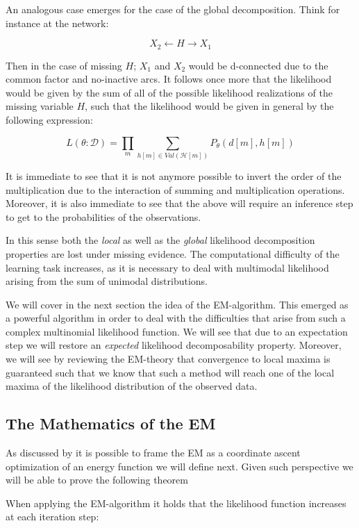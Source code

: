 \documentclass[11pt]{article}
\begin{document}
\begin{article}
An analogous case emerges for the case of the global
decomposition. Think for instance at the network:

$$ X_2 \leftarrow  H \rightarrow X_1 $$

Then in the case of missing \(H\); \(X_1\) and \(X_2\) would be
d-connected due to the common factor and no-inactive arcs. It
follows once more that the likelihood would be given by the sum of
all of the possible likelihood realizations of the missing variable
\(H\), such that the likelihood would be given in general by the
following expression:

$$ L(\theta: \mathcal{D}) = \prod_m \sum_{h[m] \in Val(\mathcal{H}[m])} P_\theta(d[m], h[m])$$

It is immediate to see that it is not anymore possible to invert
the order of the multiplication due to the interaction of summing
and multiplication operations. Moreover, it is also immediate to
see that the above will require an inference step to get to the
probabilities of the observations.

In this sense both the \emph{local} as well as the \emph{global} likelihood
decomposition properties are lost under missing evidence. The
computational difficulty of the learning task increases, as it is
necessary to deal with multimodal likelihood arising from the sum
of unimodal distributions.

We will cover in the next section the idea of the
EM-algorithm. This emerged as a powerful algorithm in order to deal
with the difficulties that arise from such a complex multinomial
likelihood function. We will see that due to an expectation step we
will restore an \emph{expected} likelihood decomposability
property. Moreover, we will see by reviewing the EM-theory that
convergence to local maxima is guaranteed such that we know that
such a method will reach one of the local maxima of the likelihood
distribution of the observed data.


\subsection{The Mathematics of the EM}
\label{math_em}
As discussed by \cite{koller2009probabilistic} it is possible to frame
the EM as a coordinate ascent optimization of an energy function we
will define next. Given such perspective we will be able to prove the
following theorem

\begin{theorem}\label{thm:one}
When applying the EM-algorithm it holds that the likelihood function increases at each iteration step:


\end{theorem}
\end{article}
\end{document}
